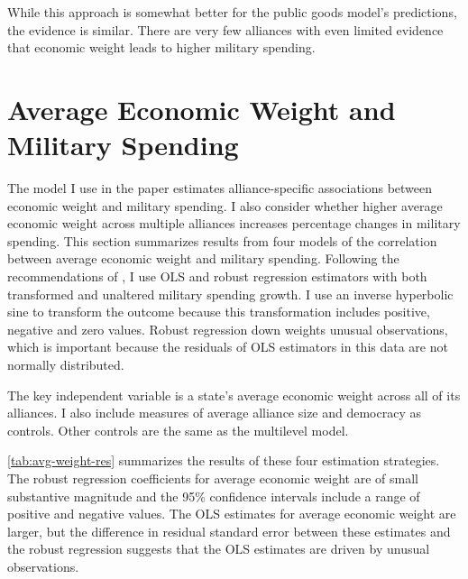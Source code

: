 \documentclass[12pt]{article}
\begin{document}
While this approach is somewhat better for the public goods model's predictions, the evidence is similar. 
There are very few alliances with even limited evidence that economic weight leads to higher military spending. 



\section{Average Economic Weight and Military Spending}


The model I use in the paper estimates alliance-specific associations between economic weight and military spending. 
I also consider whether higher average economic weight across multiple alliances increases percentage changes in military spending. 
This section summarizes results from four models of the correlation between average economic weight and military spending. 
Following the recommendations of \citet{RaineyBaissa2018}, I use OLS and robust regression estimators with both transformed and unaltered military spending growth.  
I use an inverse hyperbolic sine to transform the outcome because this transformation includes positive, negative and zero values. 
Robust regression down weights unusual observations, which is important because the residuals of OLS estimators in this data are not normally distributed. 


The key independent variable is a state's average economic weight across all of its alliances. 
I also include measures of average alliance size and democracy \citep{DigiuseppePoast2016} as controls. 
Other controls are the same as the multilevel model.  


\autoref{tab:avg-weight-res} summarizes the results of these four estimation strategies. 
The robust regression coefficients for average economic weight are of small substantive magnitude and the 95\% confidence intervals include a range of positive and negative values. 
The OLS estimates for average economic weight are larger, but the difference in residual standard error between these estimates and the robust regression suggests that the OLS estimates are driven by unusual observations. 
\end{document}
